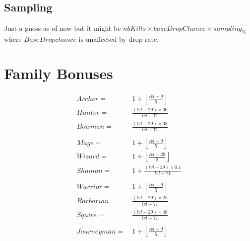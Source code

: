         \subsection{Sampling}
            \todo{}
            \newline
            \newline
            Just a guess as of now but it might be $nbKills \times baseDropChance \times sampling_\%$ where $BaseDropchance$ is unaffected by drop rate.

        \newpage
        \section{Family Bonuses}
            \begin{align*}
                Archer = &\ 1 + \left\lfloor \frac{lvl-9}{5}\right\rfloor 
                \\
                Hunter = &\ \frac{(lvl-29) \times 30}{lvl+71}
                \\
                Bowman = &\ \frac{(lvl-29) \times 38}{lvl+71}
                \\
                \\
                Mage = &\ 1 + \left\lfloor \frac{lvl-9}{5}\right\rfloor 
                \\
                Wizard = &\ 1 + \left\lfloor \frac{lvl-29}{8}\right\rfloor 
                \\
                Shaman = &\ 1 + \frac{(lvl-29) \times 0.4}{lvl + 71}
                \\
                \\
                Warrior = &\ 1 + \left\lfloor \frac{lvl-9}{5}\right\rfloor 
                \\
                Barbarian = &\ \frac{(lvl-29) \times 25}{lvl+71}
                \\
                Squire = &\ \frac{(lvl-29) \times 40}{lvl+71}
                \\
                \\
                Journeyman = &\ 1 + \left\lfloor \frac{lvl-9}{5}\right\rfloor 
            \end{align*}
